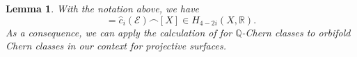 \documentclass[12pt]{amsart}
\newcommand{\<}{\leq}
\def\mcE{\mathcal{E}}
\newtheorem{lemma}[theorem]{Lemma}
\theoremstyle{remark}
\theoremstyle{definition}
\theoremstyle{definition}
\numberwithin{equation}{section}
\theoremstyle{definition}
\theoremstyle{definition}
\begin{document}
\begin{lemma}
    \label{lemma:Q-Chern-class}
With the notation above, we have 
\begin{equation}
[\overline{c}_i(\mcE) ] = \hat{c}_i(\mcE) \smallfrown [X] \in H_{4-2i}(X, \mathbb{R}).  
\end{equation} 
As a consequence, we can apply the calculation of \cite[Chapter 10]{Kol92} for $\mathbb{Q}$-Chern classes  to orbifold Chern classes in our context for projective surfaces. 
\end{lemma}


\end{document}
